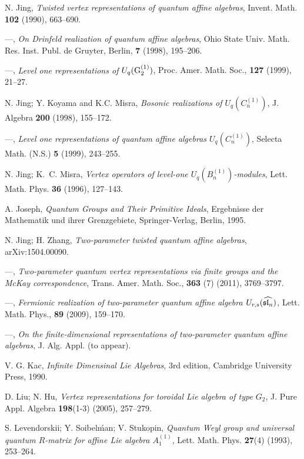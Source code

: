 \documentclass{amsproc}
\theoremstyle{remark}
\numberwithin{equation}{section}
\begin{document}
\begin{thebibliography}{15}
 N. Jing, \textit{Twisted vertex representations of quantum affine algebras}, Invent. Math.
 \textbf{102} (1990), 663--690.

 ---, \textit{On Drinfeld realization of quantum
affine algebras},  Ohio State Univ. Math. Res. Inst. Publ. de
Gruyter, Berlin, \textbf{7} (1998), 195--206.

 ---, \textit{Level one representations of
$U_q(\rm{G}_2^{(1)})$},  Proc. Amer. Math. Soc.,  \textbf {127}
(1999), 21--27.

 N. Jing; Y. Koyama and K.C. Misra,
\textit{Bosonic realizations of $U_q(C^{(1)}_n)$}, J. Algebra
\textbf{200} (1998), 155--172.

 ---, \textit{Level one
representations of quantum affine algebras $U_q(C_n^{(1)})$},
Selecta Math. (N.S.) \textbf{5} (1999), 243--255.

 N. Jing; K.~C. Misra, \textit{Vertex operators of level-one
$U_q(B_n^{(1)})$-modules}, Lett. Math. Phys. \textbf {36} (1996),
127--143.

 A. Joseph, \textit{Quantum Groups and Their Primitive
Ideals}, Ergebnisse der Mathematik und ihrer Grenzgebiete,
Springer-Verlag, Berlin, 1995.

 N. Jing; H. Zhang, \textit{Two-parameter twisted quantum affine algebras},
  arXiv:1504.00090.

 ---,  \textit{Two-parameter quantum vertex representations via finite groups
and the McKay correspondence}, Trans. Amer. Math. Soc., \textbf{363}
(7) (2011), 3769--3797.

 ---, \textit{Fermionic realization of two-parameter quantum affine algebra
$U_{r,s}(\widehat{\frak{sl}_n})$}, Lett. Math. Phys., \textbf{89}
(2009), 159--170.

 ---, \textit{On the finite-dimensional representations of two-parameter  quantum affine algebras}, J. Alg. Appl.
    (to appear).

 V. G. Kac, \textit{Infinite Dimensinal Lie Algebras}, 3rd
edition, Cambridge University Press, 1990.

 D. Liu; N. Hu, \textit{Vertex representations for toroidal Lie algebra of
type $G_2$}, J. Pure Appl. Algebra \textbf{198}(1-3) (2005),
257--279.

  S. Levendorskii; Y. Soibel\'man; V. Stukopin,
 \textit{Quantum Weyl group and universal quantum $R$-matrix for affine Lie algebra
 $A_1^{(1)}$},  Lett. Math. Phys. \textbf{27}(4) (1993), 253--264.


\end{thebibliography}
\end{document}
